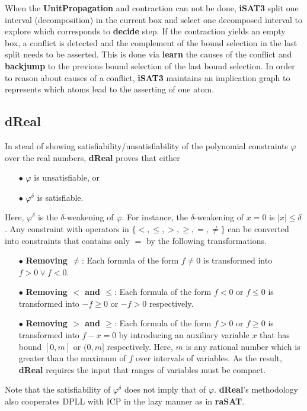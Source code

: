 When the \textbf{UnitPropagation} and contraction can not be done, \textbf{iSAT3} split one interval (decomposition) in the current box and select one decomposed interval to explore which corresponds to \textbf{decide} step. If the contraction yields an empty box, a conflict is detected and the complement of the bound selection in the last split needs to be asserted. This is done via \textbf{learn} the causes of the conflict and \textbf{backjump} to the previous bound selection of the last bound selection. In order to reason about causes of a conflict, \textbf{iSAT3} maintains an implication graph to represents which atoms lead to the asserting of one atom. 
\subsection*{dReal}
In stead of showing satisfiability/unsatisfiability of the polynomial constraints $\varphi$ over the real numbers, \textbf{dReal} proves that either
\begin{itemize}
\item [$\bullet$] $\varphi$ is unsatisfiable, or 
\item [$\bullet$] $\varphi^\delta$ is satisfiable. 
\end{itemize}
Here, $\varphi^\delta$ is the $\delta$-weakening of $\varphi$. For instance, the $\delta$-weakening of $x = 0$ is $|x| \le \delta$. Any constraint with operators in $\{<, \le, > , \ge, =, \not=\}$ can be converted into constraints that contains only $=$ by the following transformations.
\begin{itemize}
\item [$\bullet$] \textbf{Removing $\not=$}: Each formula of the form $f \not= 0$ is transformed into $f > 0 \vee f < 0$.
\item [$\bullet$] \textbf{Removing $<$ and $\le$}: Each formula of the form $f < 0$ or $f \le 0$ is transformed into $-f \ge 0$ or $-f > 0$ respectively.
\item [$\bullet$] \textbf{Removing $>$ and $\ge$}: Each formula of the form $f > 0$ or $f \ge 0$ is transformed into $f - x = 0$ by introducing an auxiliary variable $x$ that has bound $[0, m]$ or $(0, m]$ respectively. Here, $m$ is any rational number which is greater than the maximum of $f$ over intervals of variables. As the result, \textbf{dReal} requires the input that ranges of variables must be compact.
\end{itemize}

Note that the satisfiability of $\varphi^\delta$ does not imply that of $\varphi$. \textbf{dReal}'s methodology~\cite{Gao:2012:9DP:2352896.2352921} also cooperates DPLL with ICP in the lazy manner as in \textbf{raSAT}.
